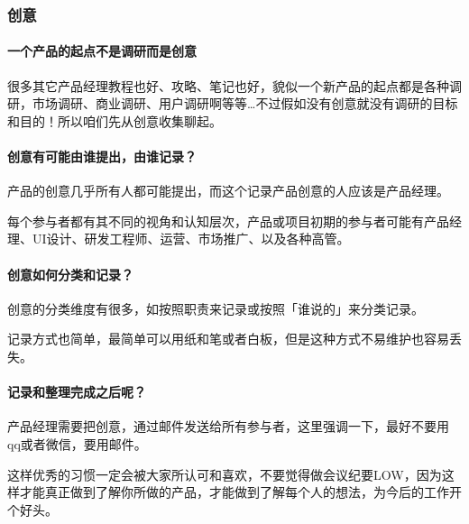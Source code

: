 \documentclass[letterpaper,10pt,english]{sphinxmanual}
\begin{document}
\subsubsection{创意}
\label{\detokenize{chapter_idea/create:id1}}\label{\detokenize{chapter_idea/create::doc}}

\paragraph{一个产品的起点不是调研而是创意}
\label{\detokenize{chapter_idea/create:id2}}
很多其它产品经理教程也好、攻略、笔记也好，貌似一个新产品的起点都是各种调研，市场调研、商业调研、用户调研啊等等…不过假如没有创意就没有调研的目标和目的！所以咱们先从创意收集聊起。%
\begin{footnote}[372]\sphinxAtStartFootnote
{}
%
\end{footnote}


\paragraph{创意有可能由谁提出，由谁记录？}
\label{\detokenize{chapter_idea/create:id3}}
产品的创意几乎所有人都可能提出，而这个记录产品创意的人应该是产品经理。

每个参与者都有其不同的视角和认知层次，产品或项目初期的参与者可能有产品经理、UI设计、研发工程师、运营、市场推广、以及各种高管。


\paragraph{创意如何分类和记录？}
\label{\detokenize{chapter_idea/create:id4}}
创意的分类维度有很多，如按照职责来记录或按照「谁说的」来分类记录。

记录方式也简单，最简单可以用纸和笔或者白板，但是这种方式不易维护也容易丢失。


\paragraph{记录和整理完成之后呢？}
\label{\detokenize{chapter_idea/create:id5}}
产品经理需要把创意，通过邮件发送给所有参与者，这里强调一下，最好不要用qq或者微信，要用邮件。


这样优秀的习惯一定会被大家所认可和喜欢，不要觉得做会议纪要LOW，因为这样才能真正做到了解你所做的产品，才能做到了解每个人的想法，为今后的工作开个好头。
\end{document}
